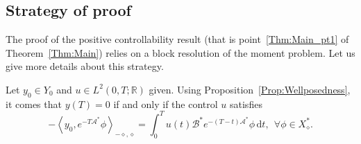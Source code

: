 \documentclass[11pt]{article}
\theoremstyle{definition}
\numberwithin{equation}{section}
\numberwithin{figure}{section}
\numberwithin{table}{section}
\newcommand\As{\mathcal{A}^*}
\newcommand\Bs{\mathcal{B}^*}
\newcommand{\Xalphas}{X_\diamond^*}
\newcommand{\Fzp}{Y_0}
\newcommand{\dual}[2]{\left\langle #1, #2 \right\rangle_{-\diamond,\diamond}}
\newcommand{\R}{\mathbb{R}}
\newcommand{\md}{\mathrm{d}}
\let\oldforall\forall
\renewcommand*{\forall}{\mathrel{\oldforall}}
\begin{document}
\subsection{Strategy of proof} \label{Subsec:Strategy}


The proof of the positive controllability result (that is point~\eqref{Thm:Main_pt1} of Theorem~\ref{Thm:Main}) relies on a block resolution of the moment problem. Let us give more details about this strategy.

Let $y_0\in \Fzp$ and $u\in L^2(0,T;\R)$ given. Using Proposition~\ref{Prop:Wellposedness}, it comes that $y(T)=0$ if and only if the control $u$ satisfies
\begin{equation}\label{premiere_equation_dualite}
- \dual{y_0}{e^{-T \As} \phi} = \int_0^T u(t) \Bs e^{-(T-t) \As} \phi\, \md t, \ \ \forall \phi\in \Xalphas.
\end{equation}
\end{document}
